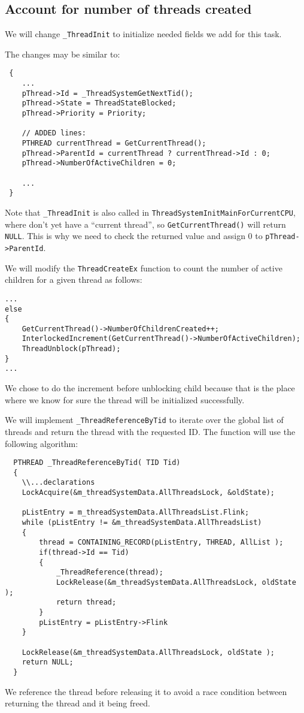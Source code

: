 \documentclass[a4paper,12pt]{report}
\begin{document}
\subsection{Account for number of threads created}

We will change \lstinline|_ThreadInit| to initialize needed fields we add for this task.

The changes may be similar to: 
\begin{lstlisting}
 {
    ...
    pThread->Id = _ThreadSystemGetNextTid();
    pThread->State = ThreadStateBlocked;
    pThread->Priority = Priority;
    
    // ADDED lines:
    PTHREAD currentThread = GetCurrentThread();
    pThread->ParentId = currentThread ? currentThread->Id : 0;
    pThread->NumberOfActiveChildren = 0;

    ...
 }
\end{lstlisting}

Note that \lstinline|_ThreadInit| is also called in \lstinline|ThreadSystemInitMainForCurrentCPU|, where don't yet have
a ``current thread'', so \lstinline|GetCurrentThread()| will return \lstinline|NULL|. This is why we need to check the returned value
and assign 0 to \lstinline|pThread->ParentId|.

We will modify the \lstinline|ThreadCreateEx| function to count the number of active children for a given thread as follows:
\begin{lstlisting}
... 
else
{
    GetCurrentThread()->NumberOfChildrenCreated++; 
    InterlockedIncrement(GetCurrentThread()->NumberOfActiveChildren); 
    ThreadUnblock(pThread);
}
... 
\end{lstlisting}

 We chose to do the increment before unblocking child because that is the place where we know for sure the thread will be initialized successfully. 
 
 We will implement \lstinline|_ThreadReferenceByTid| to iterate over the global list of threads and return the thread with the requested ID. The function will use the following algorithm:
 
 \begin{lstlisting}
  PTHREAD _ThreadReferenceByTid( TID Tid)
  {
    \\...declarations
    LockAcquire(&m_threadSystemData.AllThreadsLock, &oldState);
   
    pListEntry = m_threadSystemData.AllThreadsList.Flink;
    while (pListEntry != &m_threadSystemData.AllThreadsList)
    {
        thread = CONTAINING_RECORD(pListEntry, THREAD, AllList );
        if(thread->Id == Tid)
        {
            _ThreadReference(thread);
            LockRelease(&m_threadSystemData.AllThreadsLock, oldState );
            return thread;
        }
        pListEntry = pListEntry->Flink
    }
   
    LockRelease(&m_threadSystemData.AllThreadsLock, oldState );
    return NULL;
  }
 \end{lstlisting}
 We reference the thread before releasing it to avoid a race condition between returning the thread and it being freed.
 
\end{document}
